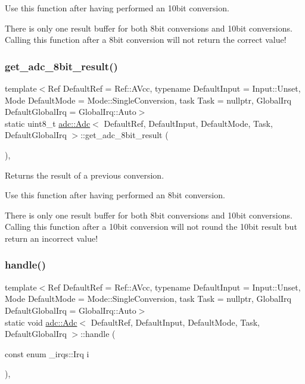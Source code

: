 Use this function after having performed an 10bit conversion.

There is only one result buffer for both 8bit conversions and 10bit conversions. Calling this function after a 8bit conversion will not return the correct value! \hypertarget{classadc_1_1Adc_a780877e68b2f2d61596e594db04179ed}{}\label{classadc_1_1Adc_a780877e68b2f2d61596e594db04179ed} 
\subsubsection{\texorpdfstring{get\+\_\+adc\+\_\+8bit\+\_\+result()}{get\_adc\_8bit\_result()}}
{\footnotesize\ttfamily template$<$Ref Default\+Ref = Ref\+::\+A\+Vcc, typename Default\+Input  = Input\+::\+Unset, Mode Default\+Mode = Mode\+::\+Single\+Conversion, task Task = nullptr, Global\+Irq Default\+Global\+Irq = Global\+Irq\+::\+Auto$>$ \\
static uint8\+\_\+t \hyperlink{classadc_1_1Adc}{adc\+::\+Adc}$<$ Default\+Ref, Default\+Input, Default\+Mode, Task, Default\+Global\+Irq $>$\+::get\+\_\+adc\+\_\+8bit\+\_\+result (\begin{DoxyParamCaption}{ }\end{DoxyParamCaption})\hspace{0.3cm}{\ttfamily [inline]}, {\ttfamily [static]}}



Returns the result of a previous conversion. 

Use this function after having performed an 8bit conversion.

There is only one result buffer for both 8bit conversions and 10bit conversions. Calling this function after a 10bit conversion will not round the 10bit result but return an incorrect value! \hypertarget{classadc_1_1Adc_a77d477385a502139b26c2f0ca83c2482}{}\label{classadc_1_1Adc_a77d477385a502139b26c2f0ca83c2482} 
\subsubsection{\texorpdfstring{handle()}{handle()}}
{\footnotesize\ttfamily template$<$Ref Default\+Ref = Ref\+::\+A\+Vcc, typename Default\+Input  = Input\+::\+Unset, Mode Default\+Mode = Mode\+::\+Single\+Conversion, task Task = nullptr, Global\+Irq Default\+Global\+Irq = Global\+Irq\+::\+Auto$>$ \\
static void \hyperlink{classadc_1_1Adc}{adc\+::\+Adc}$<$ Default\+Ref, Default\+Input, Default\+Mode, Task, Default\+Global\+Irq $>$\+::handle (\begin{DoxyParamCaption}\item[{const enum \+\_\+irqs\+::\+Irq}]{i }\end{DoxyParamCaption})\hspace{0.3cm}{\ttfamily [inline]}, {\ttfamily [static]}}



